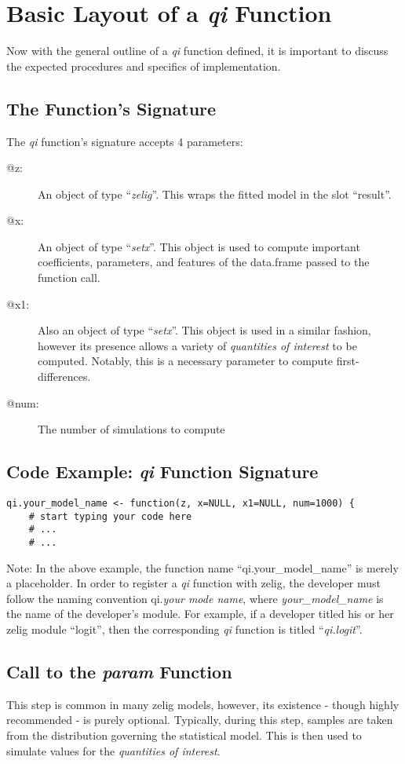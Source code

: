\documentclass[10pt]{article}
\begin{document}
%
\section{Basic Layout of a \emph{qi} Function}
Now with the general outline of a \emph{qi} function defined, it is important to discuss the expected procedures and specifics of implementation.


\subsection{The Function's Signature}
The \emph{qi} function's signature accepts 4 parameters:


%
%
\begin{description}
	\item[@z:]{An object of type ``\emph{zelig}''.  This wraps the fitted model in the slot ``result''.}
	\item[@x:]{An object of type ``\emph{setx}''.  This object is used to compute important coefficients, parameters, and features of the data.frame passed to the function call.}
	\item[@x1:]{Also an object of type ``\emph{setx}''.  This object is used in a similar fashion, however its presence allows a variety of \emph{quantities of interest} to be computed.  Notably, this is a necessary parameter to compute first-differences.}
	\item[@num:]{The number of simulations to compute}
\end{description}


%
\subsection{Code Example: \emph{qi} Function Signature}
\begin{verbatim}
qi.your_model_name <- function(z, x=NULL, x1=NULL, num=1000) {
	# start typing your code here
	# ...
	# ...
\end{verbatim}


Note: In the above example, the function name ``qi.your\_model\_name'' is merely a placeholder.  In order to register a \emph{qi} function with zelig, the developer must follow the naming convention qi.\emph{your mode name}, where \emph{your\_model\_name} is the name of the developer's module.  For example, if a developer titled his or her zelig module ``logit'', then the corresponding \emph{qi} function is titled ``\emph{qi.logit}''.

\subsection{Call to the \emph{param} Function}
This step is common in many zelig models, however, its existence - though highly recommended - is purely optional.  Typically, during this step, samples are taken from the distribution governing the statistical model.  This is then used to simulate values for the \emph{quantities of interest}.
\end{document}
